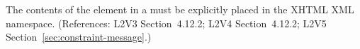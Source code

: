 The contents of the  element in a \Constraint must be
explicitly placed in the XHTML XML namespace.  (References: L2V3
Section~4.12.2; L2V4 Section~4.12.2; L2V5 Section~\ref{sec:constraint-message}.)
